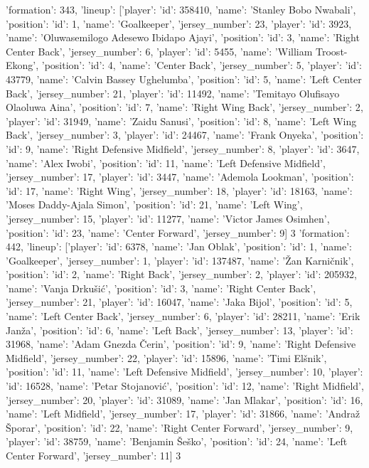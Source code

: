 {'formation': 343, 'lineup': [{'player': {'id': 358410, 'name': 'Stanley Bobo Nwabali'}, 'position': {'id': 1, 'name': 'Goalkeeper'}, 'jersey_number': 23}, {'player': {'id': 3923, 'name': 'Oluwasemilogo Adesewo Ibidapo Ajayi'}, 'position': {'id': 3, 'name': 'Right Center Back'}, 'jersey_number': 6}, {'player': {'id': 5455, 'name': 'William Troost-Ekong'}, 'position': {'id': 4, 'name': 'Center Back'}, 'jersey_number': 5}, {'player': {'id': 43779, 'name': 'Calvin Bassey Ughelumba'}, 'position': {'id': 5, 'name': 'Left Center Back'}, 'jersey_number': 21}, {'player': {'id': 11492, 'name': 'Temitayo Olufisayo Olaoluwa Aina'}, 'position': {'id': 7, 'name': 'Right Wing Back'}, 'jersey_number': 2}, {'player': {'id': 31949, 'name': 'Zaidu Sanusi'}, 'position': {'id': 8, 'name': 'Left Wing Back'}, 'jersey_number': 3}, {'player': {'id': 24467, 'name': 'Frank Onyeka'}, 'position': {'id': 9, 'name': 'Right Defensive Midfield'}, 'jersey_number': 8}, {'player': {'id': 3647, 'name': 'Alex Iwobi'}, 'position': {'id': 11, 'name': 'Left Defensive Midfield'}, 'jersey_number': 17}, {'player': {'id': 3447, 'name': 'Ademola Lookman'}, 'position': {'id': 17, 'name': 'Right Wing'}, 'jersey_number': 18}, {'player': {'id': 18163, 'name': 'Moses Daddy-Ajala Simon'}, 'position': {'id': 21, 'name': 'Left Wing'}, 'jersey_number': 15}, {'player': {'id': 11277, 'name': 'Victor James Osimhen'}, 'position': {'id': 23, 'name': 'Center Forward'}, 'jersey_number': 9}]}          3
{'formation': 442, 'lineup': [{'player': {'id': 6378, 'name': 'Jan Oblak'}, 'position': {'id': 1, 'name': 'Goalkeeper'}, 'jersey_number': 1}, {'player': {'id': 137487, 'name': 'Žan Karničnik'}, 'position': {'id': 2, 'name': 'Right Back'}, 'jersey_number': 2}, {'player': {'id': 205932, 'name': 'Vanja Drkušić'}, 'position': {'id': 3, 'name': 'Right Center Back'}, 'jersey_number': 21}, {'player': {'id': 16047, 'name': 'Jaka Bijol'}, 'position': {'id': 5, 'name': 'Left Center Back'}, 'jersey_number': 6}, {'player': {'id': 28211, 'name': 'Erik Janža'}, 'position': {'id': 6, 'name': 'Left Back'}, 'jersey_number': 13}, {'player': {'id': 31968, 'name': 'Adam Gnezda Čerin'}, 'position': {'id': 9, 'name': 'Right Defensive Midfield'}, 'jersey_number': 22}, {'player': {'id': 15896, 'name': 'Timi Elšnik'}, 'position': {'id': 11, 'name': 'Left Defensive Midfield'}, 'jersey_number': 10}, {'player': {'id': 16528, 'name': 'Petar Stojanović'}, 'position': {'id': 12, 'name': 'Right Midfield'}, 'jersey_number': 20}, {'player': {'id': 31089, 'name': 'Jan Mlakar'}, 'position': {'id': 16, 'name': 'Left Midfield'}, 'jersey_number': 17}, {'player': {'id': 31866, 'name': 'Andraž Šporar'}, 'position': {'id': 22, 'name': 'Right Center Forward'}, 'jersey_number': 9}, {'player': {'id': 38759, 'name': 'Benjamin Šeško'}, 'position': {'id': 24, 'name': 'Left Center Forward'}, 'jersey_number': 11}]}                                                                             3
